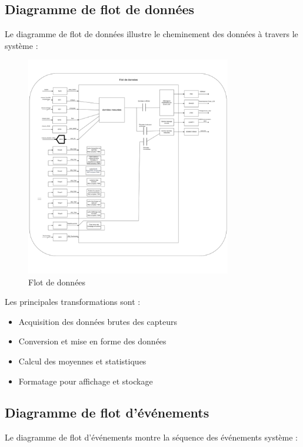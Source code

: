 \documentclass[12pt]{article}
\begin{document}
\subsection{Diagramme de flot de données}
Le diagramme de flot de données illustre le cheminement des données à travers le système :

\begin{figure}[H]
    \capstart
    \centering
    \includegraphics[width=0.8\textwidth]{./images/flot_de_donnees1.png}
    \caption{Flot de données}
    \label{fig:flot_de_donnees}
\end{figure}

Les principales transformations sont :
\begin{itemize}
    \item Acquisition des données brutes des capteurs
    \item Conversion et mise en forme des données
    \item Calcul des moyennes et statistiques
    \item Formatage pour affichage et stockage
\end{itemize}

\subsection{Diagramme de flot d'événements}
Le diagramme de flot d'événements montre la séquence des événements système :
\end{document}
